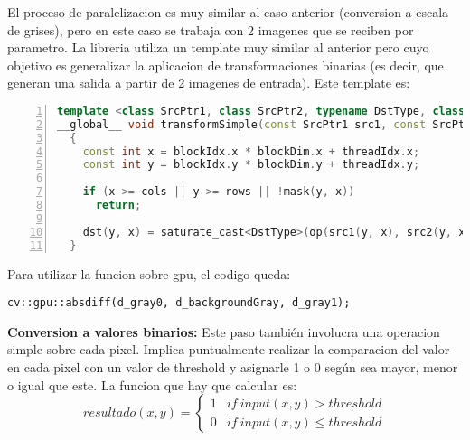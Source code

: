 \documentclass[a4paper,10pt]{report}
\begin{document}
 El proceso de paralelizacion es muy similar al caso anterior (conversion a escala de grises), pero en este caso se trabaja con 2 imagenes que se reciben por parametro. 
 La libreria utiliza un template muy similar al anterior pero cuyo objetivo es generalizar la aplicacion de transformaciones binarias (es decir, que generan una salida a partir de 2 imagenes de entrada).
 Este template es:
 
 
\begin{lstlisting}[frame=bt,title={aa},caption={modules/cudev/include/opencv2/cudev/grid/detail/transform.hpp},
columns=fullflexible,numbers=left,backgroundcolor=\color{LemonChiffon1},basicstyle=\footnotesize,keywordstyle=\ttfamily\footnotesize,language=C++,stringstyle=\ttfamily,breaklines=true,xleftmargin=0.5em,xrightmargin=0pt,aboveskip=\bigskipamount,belowskip=\bigskipamount]
template <class SrcPtr1, class SrcPtr2, typename DstType, class BinOp, class MaskPtr>
__global__ void transformSimple(const SrcPtr1 src1, const SrcPtr2 src2, GlobPtr<DstType> dst, const BinOp op, const MaskPtr mask, const int rows, const int cols)
  {
    const int x = blockIdx.x * blockDim.x + threadIdx.x;
    const int y = blockIdx.y * blockDim.y + threadIdx.y;

    if (x >= cols || y >= rows || !mask(y, x))
      return;

    dst(y, x) = saturate_cast<DstType>(op(src1(y, x), src2(y, x)));
  }
\end{lstlisting}

 
 
 
 Para utilizar la funcion sobre gpu, el codigo queda:
  \begin{lstlisting}[columns=flexible,basicstyle=\ttfamily\small\bfseries]
 cv::gpu::absdiff(d_gray0, d_backgroundGray, d_gray1);
\end{lstlisting}

 \textbf{Conversion a valores binarios:}  Este paso también involucra una operacion simple sobre cada pixel. 
 Implica puntualmente realizar la comparacion del valor en cada pixel con un valor de threshold y asignarle 1 o 0 según sea mayor, menor o igual que este.
 La funcion que hay que calcular es: 
 \begin{displaymath}
   resultado(x,y) = \left\{
     \begin{array}{lr}
       1 &  if\ input(x,y) > threshold\\
       0 &  if\ input(x,y) \leq threshold
     \end{array}
   \right.
\end{displaymath} 
\end{document}
